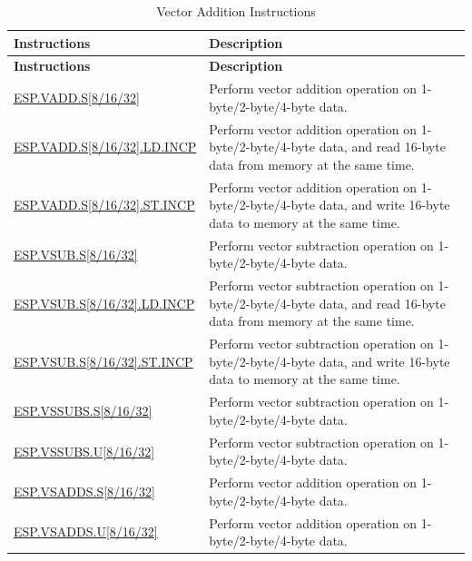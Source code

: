 \begin{longtable}[c]{|l|m{10cm}|}
    \caption{Vector Addition Instructions}
    \label{tab:pie-vadd-instructions}\\
    \hline
    \rowcolor{lightgray}
    \textbf{Instructions} & \textbf{Description} \\\hline
    \endfirsthead
    \rowcolor{lightgray}
    \textbf{Instructions} & \textbf{Description} \\\hline
    \endhead
    \endfoot
    
    \hyperref[instruction:ESPVADDS8]{ESP.VADD.S[8/16/32]} & Perform vector addition operation on 1-byte/2-byte/4-byte data.
    \\\hline
    \hyperref[instruction:ESPVADDS8LDINCP]{ESP.VADD.S[8/16/32].LD.INCP} & Perform vector addition operation on 1-byte/2-byte/4-byte data, and read 16-byte data from memory at the same time.
    \\\hline
    \hyperref[instruction:ESPVADDS8STINCP]{ESP.VADD.S[8/16/32].ST.INCP} & Perform vector addition operation on 1-byte/2-byte/4-byte data, and write 16-byte data to memory at the same time.
    \\\hline
    \hyperref[instruction:ESPVSUBS8]{ESP.VSUB.S[8/16/32]} & Perform vector subtraction operation on 1-byte/2-byte/4-byte data.
    \\\hline
    \hyperref[instruction:ESPVSUBS8LDINCP]{ESP.VSUB.S[8/16/32].LD.INCP} & Perform vector subtraction operation on 1-byte/2-byte/4-byte data, and read 16-byte data from memory at the same time.
    \\\hline
    \hyperref[instruction:ESPVSUBS8STINCP]{ESP.VSUB.S[8/16/32].ST.INCP} & Perform vector subtraction operation on 1-byte/2-byte/4-byte data, and write 16-byte data to memory at the same time.
    \\\hline

    \hyperref[instruction:ESPVSSUBSS8]{ESP.VSSUBS.S[8/16/32]} & Perform vector subtraction operation on 1-byte/2-byte/4-byte data.
    \\\hline
   \hyperref[instruction:ESPVSSUBSU8]{ESP.VSSUBS.U[8/16/32]} & Perform vector subtraction operation on 1-byte/2-byte/4-byte data.
    \\\hline

   \hyperref[instruction:ESPVSADDSS8]{ESP.VSADDS.S[8/16/32]} & Perform vector addition operation on 1-byte/2-byte/4-byte data.
    \\\hline
   \hyperref[instruction:ESPVSADDSU8]{ESP.VSADDS.U[8/16/32]} & Perform vector addition operation on 1-byte/2-byte/4-byte data.
    \\\hline
\end{longtable}